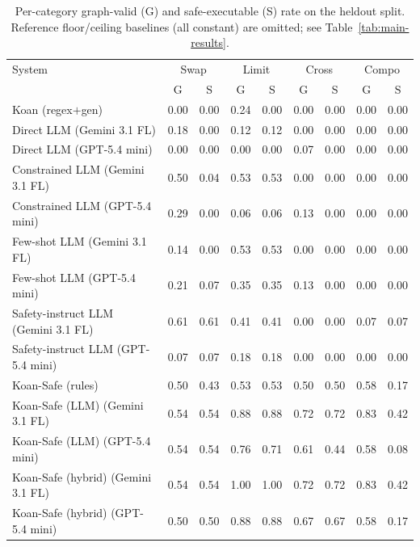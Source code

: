 \begin{table}[t]
\centering
\caption{Per-category graph-valid (G) and safe-executable (S) rate on the heldout split. Reference floor/ceiling baselines (all constant) are omitted; see Table~\ref{tab:main-results}.}
\label{tab:per-category}
\begin{tabular}{lcccccccc}
\toprule
System & \multicolumn{2}{c}{Swap} & \multicolumn{2}{c}{Limit} & \multicolumn{2}{c}{Cross} & \multicolumn{2}{c}{Compo} \\
& G & S & G & S & G & S & G & S \\
\midrule
Koan (regex$+$gen) & 0.00 & 0.00 & 0.24 & 0.00 & 0.00 & 0.00 & 0.00 & 0.00 \\
Direct LLM (Gemini 3.1 FL) & 0.18 & 0.00 & 0.12 & 0.12 & 0.00 & 0.00 & 0.00 & 0.00 \\
Direct LLM (GPT-5.4 mini) & 0.00 & 0.00 & 0.00 & 0.00 & 0.07 & 0.00 & 0.00 & 0.00 \\
Constrained LLM (Gemini 3.1 FL) & 0.50 & 0.04 & 0.53 & 0.53 & 0.00 & 0.00 & 0.00 & 0.00 \\
Constrained LLM (GPT-5.4 mini) & 0.29 & 0.00 & 0.06 & 0.06 & 0.13 & 0.00 & 0.00 & 0.00 \\
Few-shot LLM (Gemini 3.1 FL) & 0.14 & 0.00 & 0.53 & 0.53 & 0.00 & 0.00 & 0.00 & 0.00 \\
Few-shot LLM (GPT-5.4 mini) & 0.21 & 0.07 & 0.35 & 0.35 & 0.13 & 0.00 & 0.00 & 0.00 \\
Safety-instruct LLM (Gemini 3.1 FL) & 0.61 & 0.61 & 0.41 & 0.41 & 0.00 & 0.00 & 0.07 & 0.07 \\
Safety-instruct LLM (GPT-5.4 mini) & 0.07 & 0.07 & 0.18 & 0.18 & 0.00 & 0.00 & 0.00 & 0.00 \\
Koan-Safe (rules) & 0.50 & 0.43 & 0.53 & 0.53 & 0.50 & 0.50 & 0.58 & 0.17 \\
Koan-Safe (LLM) (Gemini 3.1 FL) & 0.54 & 0.54 & 0.88 & 0.88 & 0.72 & 0.72 & 0.83 & 0.42 \\
Koan-Safe (LLM) (GPT-5.4 mini) & 0.54 & 0.54 & 0.76 & 0.71 & 0.61 & 0.44 & 0.58 & 0.08 \\
Koan-Safe (hybrid) (Gemini 3.1 FL) & 0.54 & 0.54 & 1.00 & 1.00 & 0.72 & 0.72 & 0.83 & 0.42 \\
Koan-Safe (hybrid) (GPT-5.4 mini) & 0.50 & 0.50 & 0.88 & 0.88 & 0.67 & 0.67 & 0.58 & 0.17 \\
\bottomrule
\end{tabular}
\end{table}
